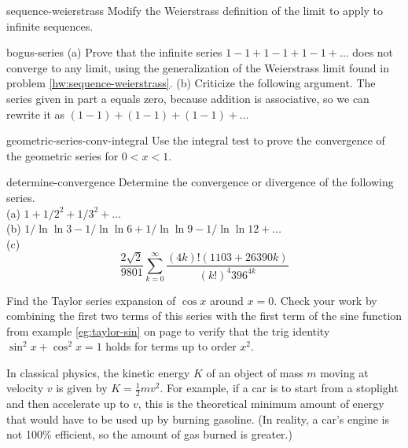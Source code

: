 \begin{hwsection}
\begin{hwwithsoln}{sequence-weierstrass}
Modify the Weierstrass definition of the limit to apply to infinite sequences.
\end{hwwithsoln}

\begin{hwwithsoln}{bogus-series}
(a) Prove that the infinite series $1-1+1-1+1-1+\ldots$ does not converge to any limit, using the generalization
of the Weierstrass limit found in problem \ref{hw:sequence-weierstrass}.
(b) Criticize the following argument. The series given in part a equals zero, because addition is associative, so we can
rewrite it as $(1-1)+(1-1)+(1-1)+\ldots$
\end{hwwithsoln}

\begin{hwwithsoln}{geometric-series-conv-integral}
Use the integral test to prove the convergence of the geometric series for $0<x<1$.
\end{hwwithsoln}

\begin{hwwithsoln}{determine-convergence}
Determine the convergence or divergence of the following series.\\
(a) $1+1/2^2+1/3^2+\ldots$\\
(b) $1/\ln\ln 3-1/\ln\ln 6+1/\ln \ln 9-1/\ln\ln 12+\ldots$\\
(c)
\begin{equation*}
\frac{2\sqrt{2}}{9801} \sum^\infty_{k=0} \frac{(4k)!(1103+26390k)}{(k!)^4 396^{4k}}
\end{equation*}
\end{hwwithsoln}

\begin{hw}
Find the Taylor series expansion of $\cos x$ around $x=0$. Check your work by combining the first two
terms of this series with the first term of the sine function from example \ref{eg:taylor-sin}
on page \pageref{eg:taylor-sin} to verify that the trig identity $\sin^2 x+\cos^2 x=1$ holds
for terms up to order $x^2$.
\end{hw}

\begin{hw}
In classical physics, the kinetic energy $K$ of an object of mass $m$ moving at velocity $v$
is given by $K=\frac{1}{2}mv^2$. For example, if a car is to start from a stoplight and then
accelerate up to $v$, this is
the theoretical minimum amount of energy  that would have to be used up by burning gasoline.
(In reality, a car's engine is not 100\% efficient, so the amount of gas burned is greater.)


\end{hw}
\end{hwsection}
